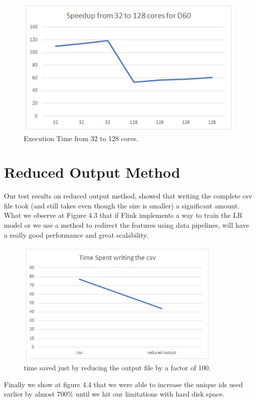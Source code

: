 \begin{figure}[ht]
\includegraphics[width=12cm]{Thesis/figures/figure2.JPG}
\caption{Execution Time from 32 to 128 cores.}
\label{fig:graph}
\end{figure}


\newpage
\section{Reduced Output Method}
Our test results on reduced output method, showed that writing the complete csv file took (and still takes even though the size is smaller) a significant amount. What we observe at Figure 4.3 that if Flink implements a way to train the LR model or we use a method to redirect the features using data pipelines, will have a really good performance and great scalability. 

\begin{figure}[ht]
\includegraphics[width=10cm]{Thesis/figures/figure4.JPG}
\caption{time saved just by reducing the output file by a factor of 100.}
\label{fig:graph}
\end{figure}

Finally we show at figure 4.4 that we were able to increase the unique ids used earlier by almost 700\% until we hit our limitations with hard disk space. 

